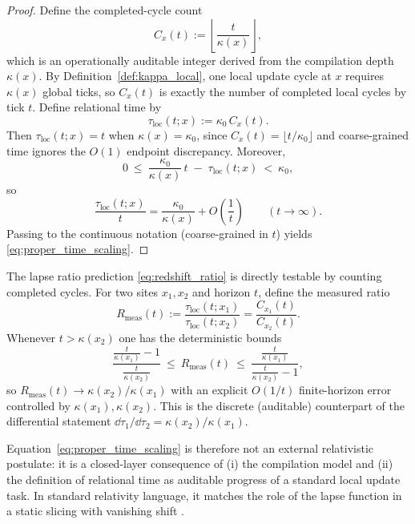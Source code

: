 \begin{proof}
Define the completed-cycle count
\[
C_x(t):=\left\lfloor \frac{t}{\kappa(x)}\right\rfloor,
\]
which is an operationally auditable integer derived from the compilation depth $\kappa(x)$.
By Definition~\ref{def:kappa_local}, one local update cycle at $x$ requires $\kappa(x)$ global ticks, so $C_x(t)$ is exactly the number of completed local cycles by tick $t$.
Define relational time by
\begin{equation}
\label{eq:tau_loc_discrete_def}
\tau_{\mathrm{loc}}(t;x):=\kappa_0\,C_x(t).
\end{equation}
Then $\tau_{\mathrm{loc}}(t;x)=t$ when $\kappa(x)=\kappa_0$, since $C_x(t)=\lfloor t/\kappa_0\rfloor$ and coarse-grained time ignores the $O(1)$ endpoint discrepancy.
Moreover,
\[
0\ \le\ \frac{\kappa_0}{\kappa(x)}\,t\;-\;\tau_{\mathrm{loc}}(t;x)\ <\ \kappa_0,
\]
so
\[
\frac{\tau_{\mathrm{loc}}(t;x)}{t}=\frac{\kappa_0}{\kappa(x)}+O\!\left(\frac{1}{t}\right)\qquad (t\to\infty).
\]
Passing to the continuous notation (coarse-grained in $t$) yields \eqref{eq:proper_time_scaling}.
\end{proof}

\begin{remark}
\label{rem:finite_horizon_redshift_test}
The lapse ratio prediction \eqref{eq:redshift_ratio} is directly testable by counting completed cycles.
For two sites $x_1,x_2$ and horizon $t$, define the measured ratio
\[
R_{\mathrm{meas}}(t):=\frac{\tau_{\mathrm{loc}}(t;x_1)}{\tau_{\mathrm{loc}}(t;x_2)}=\frac{C_{x_1}(t)}{C_{x_2}(t)}.
\]
Whenever $t>\kappa(x_2)$ one has the deterministic bounds
\[
\frac{\frac{t}{\kappa(x_1)}-1}{\frac{t}{\kappa(x_2)}}\ \le\ R_{\mathrm{meas}}(t)\ \le\ \frac{\frac{t}{\kappa(x_1)}}{\frac{t}{\kappa(x_2)}-1},
\]
so $R_{\mathrm{meas}}(t)\to \kappa(x_2)/\kappa(x_1)$ with an explicit $O(1/t)$ finite-horizon error controlled by $\kappa(x_1),\kappa(x_2)$.
This is the discrete (auditable) counterpart of the differential statement $\dd\tau_1/\dd\tau_2=\kappa(x_2)/\kappa(x_1)$.
\end{remark}

Equation~\eqref{eq:proper_time_scaling} is therefore not an external relativistic postulate: it is a closed-layer consequence of (i) the compilation model and (ii) the definition of relational time as auditable progress of a standard local update task.
In standard relativity language, it matches the role of the lapse function in a static slicing with vanishing shift \cite{MisnerThorneWheeler1973,Wald1984,Carroll2004}.

